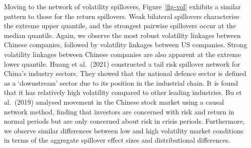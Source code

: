 \documentclass[
  letterpaper,
  DIV=11,
  numbers=noendperiod]{scrartcl}
\begin{document}
Moving to the network of volatility spillovers, Figure~\ref{fig-vol}
exhibits a similar pattern to those for the return spillovers. Weak
bilateral spillovers characterise the extreme upper quantile, and the
strongest pairwise spillovers occur at the median quantile. Again, we
observe the most robust volatility linkages between Chinese companies,
followed by volatility linkages between US companies. Strong volatility
linkages between Chinese companies are also apparent at the extreme
lower quantile. Huang et al.~(2021) constructed a tail risk spillover
network for China's industry sectors. They showed that the national
defence sector is defined as a `downstream' sector due to its position
in the industrial chain. It is found that it has relatively high
volatility compared to other leading industries. Bu et al.~(2019)
analysed movement in the Chinese stock market using a causal network
method, finding that investors are concerned with risk and return in
normal periods but are only concerned about risk in crisis periods.
Furthermore, we observe similar differences between low and high
volatility market conditions in terms of the aggregate spillover effect
sizes and distributional differences.
\end{document}
